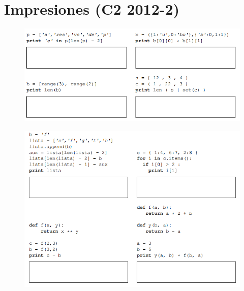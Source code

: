 \section{Impresiones (C2 2012-2)}
\begin{figure}[h]
    \centering
    \includegraphics[scale=0.85]{Imagenes/1.png}
\end{figure}
\begin{figure}[h]
    \centering
    \includegraphics[scale=0.9]{Imagenes/2.PNG}
\end{figure}